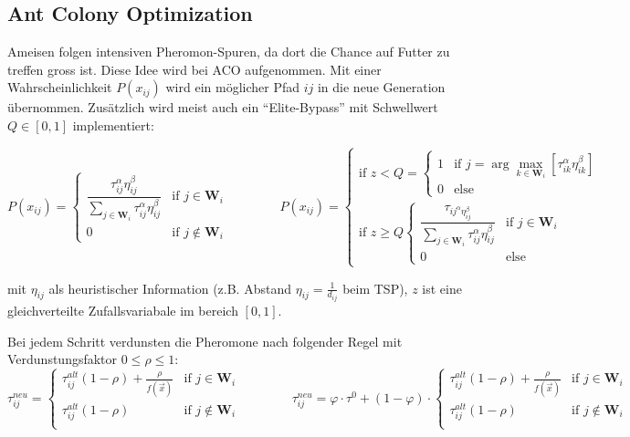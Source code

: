    
  \subsection{Ant Colony Optimization }
  Ameisen folgen intensiven Pheromon-Spuren, da dort die Chance auf Futter zu treffen gross ist. Diese Idee wird bei ACO aufgenommen. Mit einer Wahrscheinlichkeit $P(x_{ij})$ wird ein möglicher Pfad $ij$ in die neue Generation übernommen. Zusätzlich wird meist auch ein "`Elite-Bypass"' mit Schwellwert $Q \in [0,1]$ implementiert:
  
  $$P(x_{ij}) = \begin{cases} \dfrac{\tau_{ij}^\alpha \eta_{ij}^\beta}{\sum\limits_{j \in \mathbf{W}_i} \tau_{ij}^\alpha \eta_{ij}^\beta}  & \text{if }j \in \mathbf{W}_i\\ 0 & \text{if }j \notin \mathbf{W}_i \end{cases}
  \qquad \qquad
  P(x_{ij}) = 
  \begin{cases}
    \text{if } z < Q = 
    \begin{cases}
      1 & \text{if } j = \arg \max\limits_{k \in \mathbf{W}_i}[\tau_{ik}^\alpha \eta_{ik}^\beta] \\
      0 & \text{else}
    \end{cases} \\
    \text{if } z \geq Q
    \begin{cases}
      \dfrac{\tau_{ij^\alpha \eta_{ij}^\beta}}{\sum\limits_{j \in \mathbf{W}_i} \tau_{ij}^\alpha \eta_{ij}^\beta}  & \text{if }j \in \mathbf{W}_i\\
      0 & \text{else}
    \end{cases}
  \end{cases}$$
  
  mit $\eta_{ij}$ als heuristischer Information (z.B. Abstand $\eta_{ij} = \frac{1}{d_{ij}}$ beim TSP), $z$ ist eine gleichverteilte Zufallsvariabale im bereich $[0,1]$.
  
  Bei jedem Schritt verdunsten die Pheromone nach folgender Regel mit Verdunstungsfaktor $0 \leq \rho \leq 1$:
  $$\tau_{ij}^{neu} = \begin{cases}
    \tau_{ij}^{alt} (1-\rho) + \frac{\rho}{f(\vec{x})} & \text{if } j \in \mathbf{W}_i\\
    \tau_{ij}^{alt} (1-\rho) & \text{if } j \notin \mathbf{W}_i\\
  \end{cases}
  \qquad \qquad
  \tau_{ij}^{neu} = \varphi \cdot \tau^0 + (1-\varphi) \cdot
  \begin{cases}
      \tau_{ij}^{alt} (1-\rho) + \frac{\rho}{f(\vec{x})} & \text{if } j \in \mathbf{W}_i\\
      \tau_{ij}^{alt} (1-\rho) & \text{if } j \notin \mathbf{W}_i\\
    \end{cases}
  $$
  
